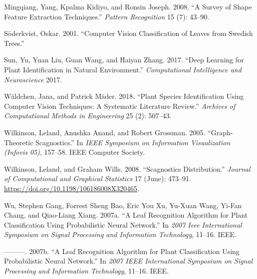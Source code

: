 \documentclass{article}
\begin{document}
\leavevmode\hypertarget{ref-article7}{}%
Mingqiang, Yang, Kpalma Kidiyo, and Ronsin Joseph. 2008. ``A Survey of
Shape Feature Extraction Techniques.'' \emph{Pattern Recognition} 15
(7): 43--90.

\leavevmode\hypertarget{ref-soderkvist2001computer}{}%
Söderkvist, Oskar. 2001. ``Computer Vision Classification of Leaves from
Swedish Trees.''

\leavevmode\hypertarget{ref-sun2017deep}{}%
Sun, Yu, Yuan Liu, Guan Wang, and Haiyan Zhang. 2017. ``Deep Learning
for Plant Identification in Natural Environment.'' \emph{Computational
Intelligence and Neuroscience} 2017.

\leavevmode\hypertarget{ref-articlee}{}%
Wäldchen, Jana, and Patrick Mäder. 2018. ``Plant Species Identification
Using Computer Vision Techniques: A Systematic Literature Review.''
\emph{Archives of Computational Methods in Engineering} 25 (2): 507--43.

\leavevmode\hypertarget{ref-inproceedings44}{}%
Wilkinson, Leland, Anushka Anand, and Robert Grossman. 2005.
``Graph-Theoretic Scagnostics.'' In \emph{IEEE Symposium on Information
Visualization (Infovis 05)}, 157--58. IEEE Computer Society.

\leavevmode\hypertarget{ref-article37}{}%
Wilkinson, Leland, and Graham Wills. 2008. ``Scagnostics Distribution.''
\emph{Journal of Computational and Graphical Statistics} 17 (June):
473--91. \url{https://doi.org/10.1198/106186008X320465}.

\leavevmode\hypertarget{ref-4458016}{}%
Wu, Stephen Gang, Forrest Sheng Bao, Eric You Xu, Yu-Xuan Wang, Yi-Fan
Chang, and Qiao-Liang Xiang. 2007a. ``A Leaf Recognition Algorithm for
Plant Classification Using Probabilistic Neural Network.'' In \emph{2007
Ieee International Symposium on Signal Processing and Information
Technology}, 11--16. IEEE.

\leavevmode\hypertarget{ref-wu2007leaf}{}%
---------. 2007b. ``A Leaf Recognition Algorithm for Plant
Classification Using Probabilistic Neural Network.'' In \emph{2007 IEEE
International Symposium on Signal Processing and Information
Technology}, 11--16. IEEE.



\end{document}
